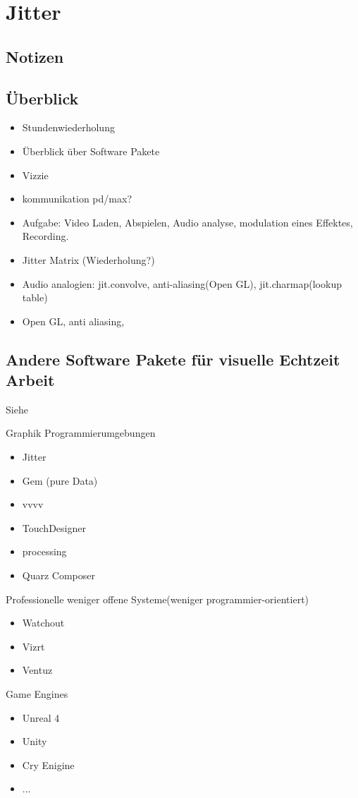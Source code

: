 \chapter{Jitter}
\label{Jitter}
\section{Notizen}

\section{Überblick}
\begin{itemize}
	\item Stundenwiederholung
	\item Überblick über Software Pakete
	\item Vizzie
	\item kommunikation pd/max?
	\item Aufgabe: Video Laden, Abspielen, Audio analyse, modulation eines Effektes, Recording.
	\item Jitter Matrix (Wiederholung?)
	\item Audio analogien: jit.convolve, anti-aliasing(Open GL), jit.charmap(lookup table)

	\item Open GL, anti aliasing,
\end{itemize}

\section{Andere Software Pakete für visuelle Echtzeit Arbeit}
Siehe 

Graphik Programmierumgebungen
\begin{itemize}
	\item Jitter
	\item Gem (pure Data)
	\item vvvv
	\item TouchDesigner
	\item processing
	\item Quarz Composer
\end{itemize}
\glqq{}Professionelle\grqq{} weniger offene Systeme(weniger programmier-orientiert)
\begin{itemize}
	\item Watchout
	\item Vizrt
	\item Ventuz
\end{itemize}
Game Engines
\begin{itemize}
	\item Unreal 4
	\item Unity
	\item Cry Enigine
	\item ...
\end{itemize}


